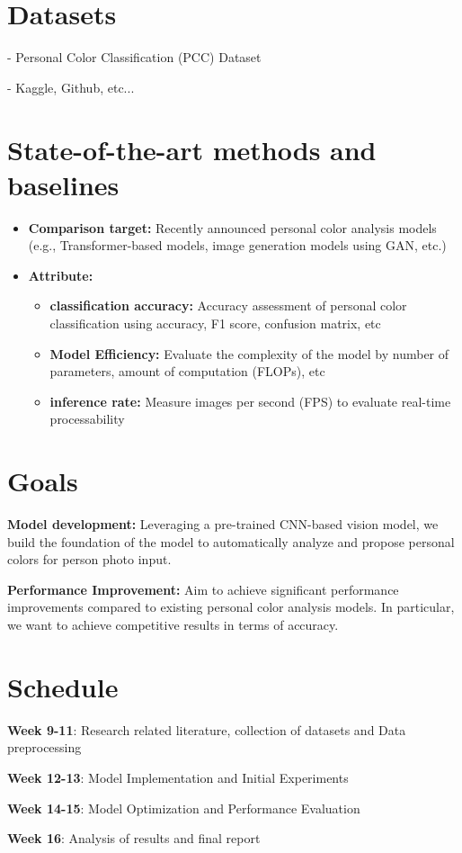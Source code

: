 \documentclass{article}
\begin{document}
\section{Datasets}
- Personal Color Classification (PCC) Dataset

- Kaggle, Github, etc...


\section{State-of-the-art methods and baselines}
\begin{itemize}
    \item \textbf{Comparison target:} Recently announced personal color analysis models (e.g., Transformer-based models, image generation models using GAN, etc.)
    \item \textbf{Attribute:}
        \begin{itemize}
        \item \textbf{classification accuracy:} Accuracy assessment of personal color classification using accuracy, F1 score, confusion matrix, etc
        \item \textbf{Model Efficiency:} Evaluate the complexity of the model by number of parameters, amount of computation (FLOPs), etc
        \item \textbf{inference rate:} Measure images per second (FPS) to evaluate real-time processability
        \end{itemize}
\end{itemize}

\section{Goals}
\textbf{Model development:} Leveraging a pre-trained CNN-based vision model, we build the foundation of the model to automatically analyze and propose personal colors for person photo input.

\textbf{Performance Improvement:} Aim to achieve significant performance improvements compared to existing personal color analysis models. In particular, we want to achieve competitive results in terms of accuracy.

\section{Schedule}
\textbf{Week 9-11}: Research related literature, collection of datasets and Data preprocessing

\textbf{Week 12-13}: Model Implementation and Initial Experiments

\textbf{Week 14-15}: Model Optimization and Performance Evaluation

\textbf{Week 16}: Analysis of results and final report

\end{document}
